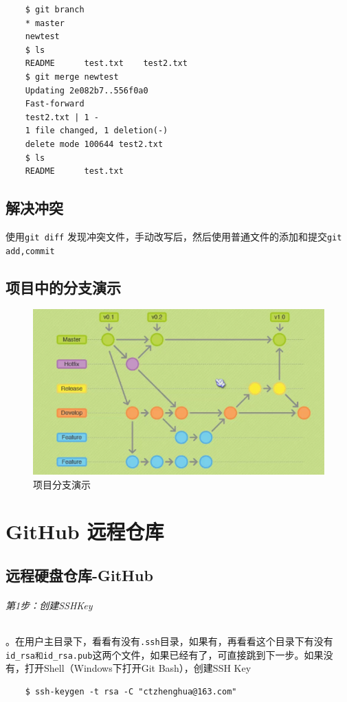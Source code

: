 \documentclass[UTF8,a4paper,12pt]{ctexbook}
\begin{document}
			  \begin{lstlisting}
	$ git branch
	* master
	newtest
	$ ls
	README		test.txt	test2.txt
	$ git merge newtest
	Updating 2e082b7..556f0a0
	Fast-forward
	test2.txt | 1 -
	1 file changed, 1 deletion(-)
	delete mode 100644 test2.txt
	$ ls
	README		test.txt
			  \end{lstlisting}
	  \section{解决冲突}
		  使用\verb|git diff| 发现冲突文件，手动改写后，然后使用普通文件的添加和提交\verb|git add,commit|
  
	  
	  
	  \section{项目中的分支演示}
		  \begin{figure}[htbp]
		  	\centering
		  	\includegraphics[scale = 0.7]{figure/BranchIn.png}
		  	\caption{项目分支演示}
		  \end{figure}
		  
  \chapter{GitHub 远程仓库}
	  \section{远程硬盘仓库-GitHub}
		  \subparagraph{第1步：创建SSHKey}。在用户主目录下，看看有没有\verb|.ssh|目录，如果有，再看看这个目录下有没有\verb|id_rsa和id_rsa.pub|这两个文件，如果已经有了，可直接跳到下一步。如果没有，打开Shell（Windows下打开Git Bash），创建SSH Key
		  
		  \begin{lstlisting}
	$ ssh-keygen -t rsa -C "ctzhenghua@163.com"
		  \end{lstlisting}
		  
\end{document}
